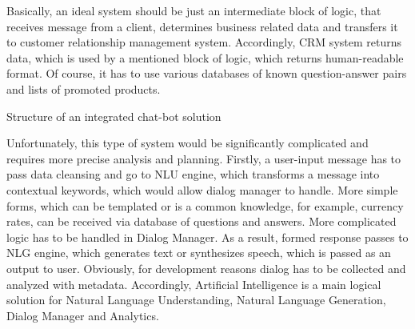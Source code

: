Basically, an ideal system should be just an intermediate block of logic, that receives message from a client, determines business related data and transfers it to customer relationship management system.
Accordingly, CRM system returns data, which is used by a mentioned block of logic, which returns human-readable format.
Of course, it has to use various databases of known question-answer pairs and lists of promoted products.

\begin{table}
    \centering
    \caption{Structure of an integrated chat-bot solution}
    \medskip
\end{table}    

Unfortunately, this type of system would be significantly complicated and requires more precise analysis and planning.
Firstly, a user-input message has to pass data cleansing and go to NLU engine, which transforms a message into contextual keywords, which would allow dialog manager to handle.
More simple forms, which can be templated or is a common knowledge, for example, currency rates, can be received via database of questions and answers.
More complicated logic has to be handled in Dialog Manager.
As a result, formed response passes to NLG engine, which generates text or synthesizes speech, which is passed as an output to user.
Obviously, for development reasons dialog has to be collected and analyzed with metadata. 
Accordingly, Artificial Intelligence is a main logical solution for Natural Language Understanding, Natural Language Generation, Dialog Manager and Analytics.

